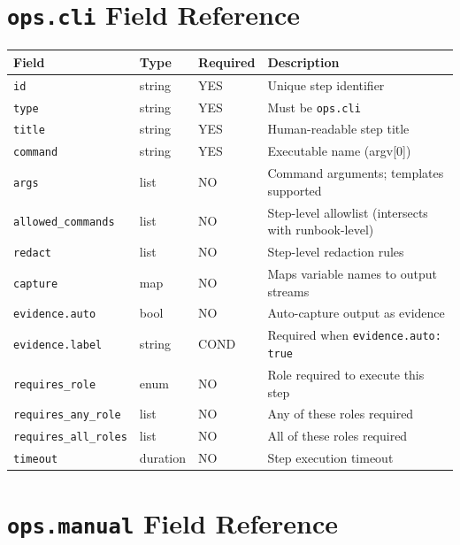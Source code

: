 \section{\texttt{ops.cli} Field Reference}
\label{sec:ref-ops-cli}

\begin{center}
\small
\begin{tabular}{lllp{5cm}}
\textbf{Field} & \textbf{Type} & \textbf{Required} & \textbf{Description} \\
\hline
\texttt{id} & string & YES & Unique step identifier \\
\texttt{type} & string & YES & Must be \texttt{ops.cli} \\
\texttt{title} & string & YES & Human-readable step title \\
\texttt{command} & string & YES & Executable name (argv[0]) \\
\texttt{args} & list & NO & Command arguments; templates supported \\
\texttt{allowed\_commands} & list & NO & Step-level allowlist (intersects with runbook-level) \\
\texttt{redact} & list & NO & Step-level redaction rules \\
\texttt{capture} & map & NO & Maps variable names to output streams \\
\texttt{evidence.auto} & bool & NO & Auto-capture output as evidence \\
\texttt{evidence.label} & string & COND & Required when \texttt{evidence.auto: true} \\
\texttt{requires\_role} & enum & NO & Role required to execute this step \\
\texttt{requires\_any\_role} & list & NO & Any of these roles required \\
\texttt{requires\_all\_roles} & list & NO & All of these roles required \\
\texttt{timeout} & duration & NO & Step execution timeout \\
\end{tabular}
\end{center}

\section{\texttt{ops.manual} Field Reference}
\label{sec:ref-ops-manual}

